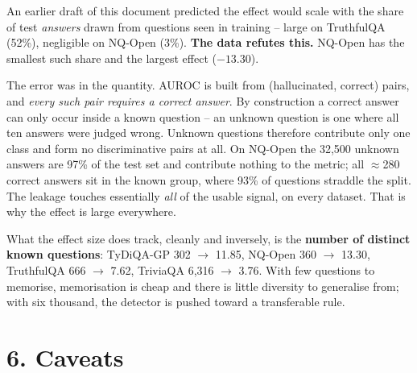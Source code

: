 \documentclass[11pt,a4paper]{article}
\begin{document}
An earlier draft of this document predicted the effect would scale with the share of test
\emph{answers} drawn from questions seen in training -- large on TruthfulQA (52\%), negligible on
NQ-Open (3\%). \textbf{The data refutes this.} NQ-Open has the smallest such share and the largest
effect ($-13.30$).

The error was in the quantity. AUROC is built from (hallucinated, correct) pairs, and \emph{every
such pair requires a correct answer}. By construction a correct answer can only occur inside a known
question -- an unknown question is one where all ten answers were judged wrong. Unknown questions
therefore contribute only one class and form no discriminative pairs at all. On NQ-Open the 32{,}500
unknown answers are 97\% of the test set and contribute nothing to the metric; all $\approx$280
correct answers sit in the known group, where 93\% of questions straddle the split. The leakage
touches essentially \emph{all} of the usable signal, on every dataset. That is why the effect is
large everywhere.

What the effect size does track, cleanly and inversely, is the \textbf{number of distinct known
questions}: TyDiQA-GP 302 $\to$ 11.85, NQ-Open 360 $\to$ 13.30, TruthfulQA 666 $\to$ 7.62, TriviaQA
6{,}316 $\to$ 3.76. With few questions to memorise, memorisation is cheap and there is little
diversity to generalise from; with six thousand, the detector is pushed toward a transferable rule.

\section*{6. Caveats}
\end{document}
